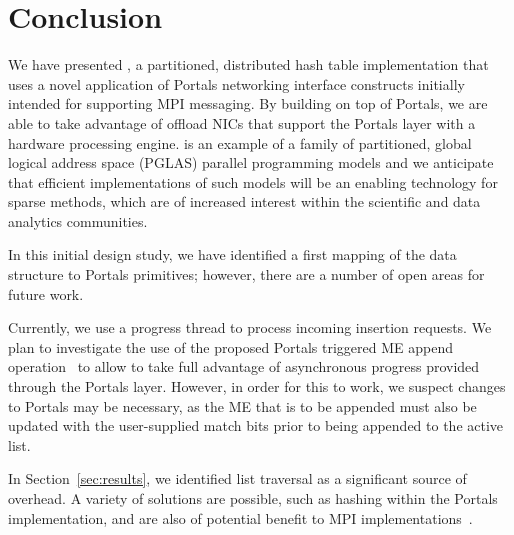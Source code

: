 \vspace{-1mm}

\section{Conclusion}


We have presented \pdht, a partitioned, distributed hash table implementation
that uses a novel application of Portals networking interface constructs
initially intended for supporting MPI messaging.  By building \pdht on top of
Portals, we are able to take advantage of offload NICs that support the
Portals layer with a hardware processing engine.  \pdht is an example of a
family of partitioned, global logical address space (PGLAS) parallel
programming models and we anticipate that efficient implementations of such
models will be an enabling technology for sparse methods, which are of
increased interest within the scientific and data analytics communities.

In this initial design study, we have identified a first mapping of the \pdht
data structure to Portals primitives; however, there are a number of open areas
for future work.

Currently, we use a progress thread to process incoming insertion requests.  We
plan to investigate the use of the proposed Portals triggered ME append
operation~\cite{schneider:13} to allow \pdht to take full advantage of
asynchronous progress provided through the Portals layer.  However, in order
for this to work, we suspect changes to Portals may be necessary, as the ME
that is to be appended must also be updated with the user-supplied match bits
prior to being appended to the active list.

In Section~\ref{sec:results}, we identified list traversal as a significant
source of overhead.  A variety of solutions are possible, such as hashing
within the Portals implementation, and are also of potential benefit to MPI
implementations~\cite{flajslik:16}.

